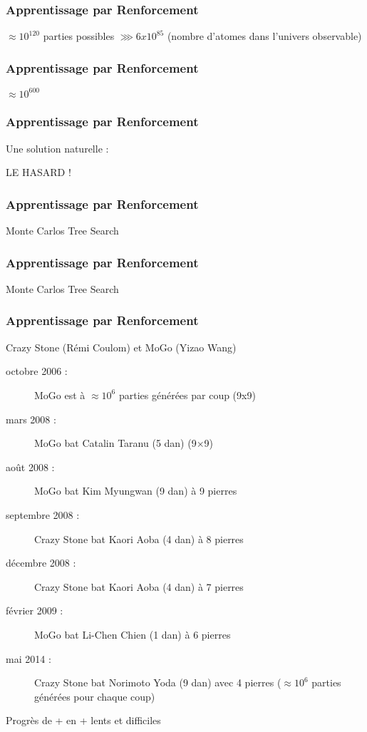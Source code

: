 \documentclass{formation}
\begin{document}
\begin{frame}
  \frametitle{Apprentissage par Renforcement}
  \begin{center}
  \end{center}
  \begin{center}
    $\approx 10^{120}$ parties possibles $\ggg 6 x 10^{85}$
    \newline
    (nombre d'atomes dans l'univers observable)
  \end{center}
\end{frame}

\begin{frame}
  \frametitle{Apprentissage par Renforcement}
  \begin{center}
    \huge{$\approx 10^{600}$}
  \end{center}
\end{frame}

\begin{frame}
  \frametitle{Apprentissage par Renforcement}
  \huge Une solution naturelle :
  \newline
  \begin{center}
  \huge LE HASARD !
  \end{center}
\end{frame}

\begin{frame}
  \frametitle{Apprentissage par Renforcement}
  Monte Carlos Tree Search
\end{frame}

\begin{frame}
  \frametitle{Apprentissage par Renforcement}
  Monte Carlos Tree Search
\end{frame}

\begin{frame}
  \frametitle{Apprentissage par Renforcement}
  Crazy Stone (Rémi Coulom) et MoGo (Yizao Wang)
  \newline
  \begin{description}
  \item[octobre 2006 :] MoGo est à $\approx 10^6$ parties générées par coup (9x9)
  \item[mars 2008 :] MoGo bat Catalin Taranu (5 dan) (9×9)
  \item[août 2008 :] MoGo bat Kim Myungwan (9 dan) à 9 pierres
  \item[septembre 2008 :] Crazy Stone bat Kaori Aoba (4 dan) à 8 pierres
  \item[décembre 2008 :] Crazy Stone bat Kaori Aoba (4 dan) à 7 pierres
  \item[février 2009 :] MoGo bat Li-Chen Chien (1 dan) à 6 pierres
  \item[mai 2014 :] Crazy Stone bat Norimoto Yoda (9 dan) avec 4 pierres ($\approx 10^{6}$ parties générées pour chaque coup)
  \end{description}
  \begin{center}
    Progrès de + en + lents et difficiles
  \end{center}
\end{frame}
\end{document}
